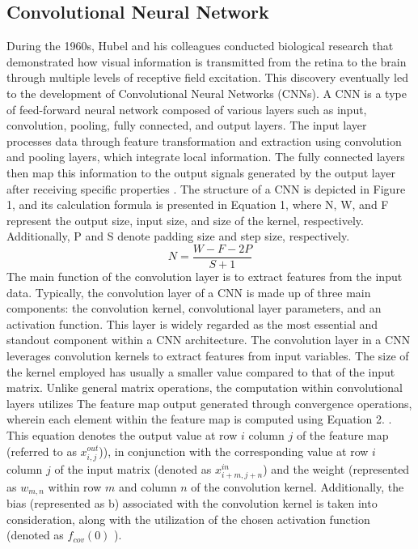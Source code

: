 \documentclass{article}
\begin{document}
\subsection{Convolutional Neural Network}\label{secCNN}
During the 1960s, Hubel and his colleagues conducted biological research that demonstrated how visual information is transmitted from the retina to the brain through multiple levels of receptive field excitation. This discovery eventually led to the development of Convolutional Neural Networks (CNNs). A CNN is a type of feed-forward neural network composed of various layers such as input, convolution, pooling, fully connected, and output layers. The input layer processes data through feature transformation and extraction using convolution and pooling layers, which integrate local information. The fully connected layers then map this information to the output signals generated by the output layer after receiving specific properties  \cite{lecun2015deep}. The structure of a CNN is depicted in Figure 1, and its calculation formula is presented in Equation 1, where N, W, and F represent the output size, input size, and size of the kernel, respectively. Additionally, P and S denote padding size and step size, respectively.
\begin{equation}
N=\frac{W-F-2P}{S+1}
\end{equation}
The main function of the convolution layer is to extract features from the input data. Typically, the convolution layer of a CNN is made up of three main components: the convolution kernel, convolutional layer parameters, and an activation function. This layer is widely regarded as the most essential and standout component within a CNN architecture. The convolution layer in a CNN leverages convolution kernels to extract features from input variables. The size of the kernel employed has usually a smaller value compared to that of the input matrix. Unlike general matrix operations, the computation within convolutional layers utilizes The feature map output generated through convergence operations, wherein each element within the feature map is computed using Equation 2.  \cite{wang2017deterministic}. This equation denotes the output value at row $i$ column $j$ of the feature map (referred to as $x_{i,j}^{out}$)), in conjunction with the corresponding value at row $i$ column $j$  of the input matrix (denoted as $x_{i+m,j+n}^{in}$) and the weight (represented as  $w_{m,n}$ within row $m$  and column $n$ of the convolution kernel. Additionally, the bias (represented as b) associated with the convolution kernel is taken into consideration, along with the utilization of the chosen activation function (denoted as $f_{cov} (0)$ ).
\end{document}
